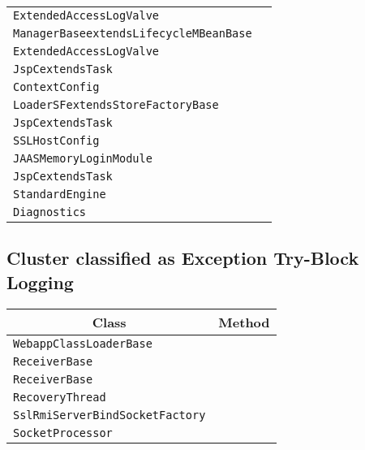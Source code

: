 \begin{center}
\begin{tabular}{ll}
\lstinline/ExtendedAccessLogValve/&\raisebox{0pt}{\lstinline/getServletRequestElement(String)/}\\ 
\lstinline/ManagerBaseextendsLifecycleMBeanBase/&\raisebox{0pt}{\lstinline/getCreationTime(String)/}\\ 
\lstinline/ExtendedAccessLogValve/&\raisebox{0pt}{\lstinline/getServletRequestElement(String)/}\\ 
\lstinline/JspCextendsTask/&\raisebox{0pt}{\lstinline/locateUriRoot(File)/}\\ 
\lstinline/ContextConfig/&\raisebox{0pt}{\lstinline/processAnnotationsFile(File))/}\\ 
\lstinline/LoaderSFextendsStoreFactoryBase/&\raisebox{0pt}{\lstinline/store(PrintWriter)/}\\ 
\lstinline/JspCextendsTask/&\raisebox{0pt}{\lstinline/locateUriRoot(File)/}\\ 
\lstinline/SSLHostConfig/&\raisebox{0pt}{\lstinline/adjustRelativePath(String)/}\\ 
\lstinline/JAASMemoryLoginModule/&\raisebox{0pt}{\lstinline/load()/}\\ 
\lstinline/JspCextendsTask/&\raisebox{0pt}{\lstinline/locateUriRoot(File)/}\\ 
\lstinline/StandardEngine/&\raisebox{0pt}{\lstinline/logAccess(Request,long,boolean)/}\\ 
\lstinline/Diagnostics/&\raisebox{0pt}{\lstinline/setVerboseGarbageCollection(boolean)/}\\ 

\bottomrule
\end{tabular}
\end{center}

\subsection{Cluster classified as Exception Try-Block Logging}

\begin{center}
\begin{tabular}{ll}\toprule
\multicolumn{1}{c}{Class}&\multicolumn{1}{c}{Method}\\\midrule
\lstinline/WebappClassLoaderBase/&\raisebox{0pt}{\lstinline/findClassInternal(String)/}\\ 
\lstinline/ReceiverBase/&\raisebox{0pt}{\lstinline/intbindUdp(DatagramSocket)/}\\ 
\lstinline/ReceiverBase/&\raisebox{0pt}{\lstinline/intbindUdp(DatagramSocket)/}\\ 
\lstinline/RecoveryThread/&\raisebox{0pt}{\lstinline/run()/}\\ 
\lstinline/SslRmiServerBindSocketFactory/&\raisebox{0pt}{\lstinline/miServerBindSocketFactory(String[],String[],boolean,String)/}\\ 
\lstinline/SocketProcessor/&\raisebox{0pt}{\lstinline/doRun()/}\\ 
\bottomrule
\end{tabular}
\end{center}

